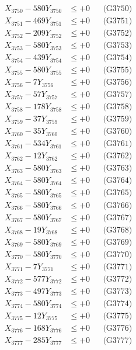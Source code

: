 \documentclass[a4paper,10pt]{article}
\begin{document}
{\begin{align}
X_{3750} - 580Y_{3750} &\leq +0 && \text{(G3750)} \\
\allowbreak
X_{3751} - 469Y_{3751} &\leq +0 && \text{(G3751)} \\
X_{3752} - 209Y_{3752} &\leq +0 && \text{(G3752)} \\
X_{3753} - 580Y_{3753} &\leq +0 && \text{(G3753)} \\
X_{3754} - 439Y_{3754} &\leq +0 && \text{(G3754)} \\
X_{3755} - 580Y_{3755} &\leq +0 && \text{(G3755)} \\
X_{3756} - 7Y_{3756} &\leq +0 && \text{(G3756)} \\
X_{3757} - 57Y_{3757} &\leq +0 && \text{(G3757)} \\
X_{3758} - 178Y_{3758} &\leq +0 && \text{(G3758)} \\
X_{3759} - 37Y_{3759} &\leq +0 && \text{(G3759)} \\
X_{3760} - 35Y_{3760} &\leq +0 && \text{(G3760)} \\
\allowbreak
X_{3761} - 534Y_{3761} &\leq +0 && \text{(G3761)} \\
X_{3762} - 12Y_{3762} &\leq +0 && \text{(G3762)} \\
X_{3763} - 580Y_{3763} &\leq +0 && \text{(G3763)} \\
X_{3764} - 580Y_{3764} &\leq +0 && \text{(G3764)} \\
X_{3765} - 580Y_{3765} &\leq +0 && \text{(G3765)} \\
X_{3766} - 580Y_{3766} &\leq +0 && \text{(G3766)} \\
X_{3767} - 580Y_{3767} &\leq +0 && \text{(G3767)} \\
X_{3768} - 19Y_{3768} &\leq +0 && \text{(G3768)} \\
X_{3769} - 580Y_{3769} &\leq +0 && \text{(G3769)} \\
X_{3770} - 580Y_{3770} &\leq +0 && \text{(G3770)} \\
\allowbreak
X_{3771} - 7Y_{3771} &\leq +0 && \text{(G3771)} \\
X_{3772} - 577Y_{3772} &\leq +0 && \text{(G3772)} \\
X_{3773} - 497Y_{3773} &\leq +0 && \text{(G3773)} \\
X_{3774} - 580Y_{3774} &\leq +0 && \text{(G3774)} \\
X_{3775} - 12Y_{3775} &\leq +0 && \text{(G3775)} \\
X_{3776} - 168Y_{3776} &\leq +0 && \text{(G3776)} \\
X_{3777} - 285Y_{3777} &\leq +0 && \text{(G3777)} \\

\end{align}}
\end{document}
